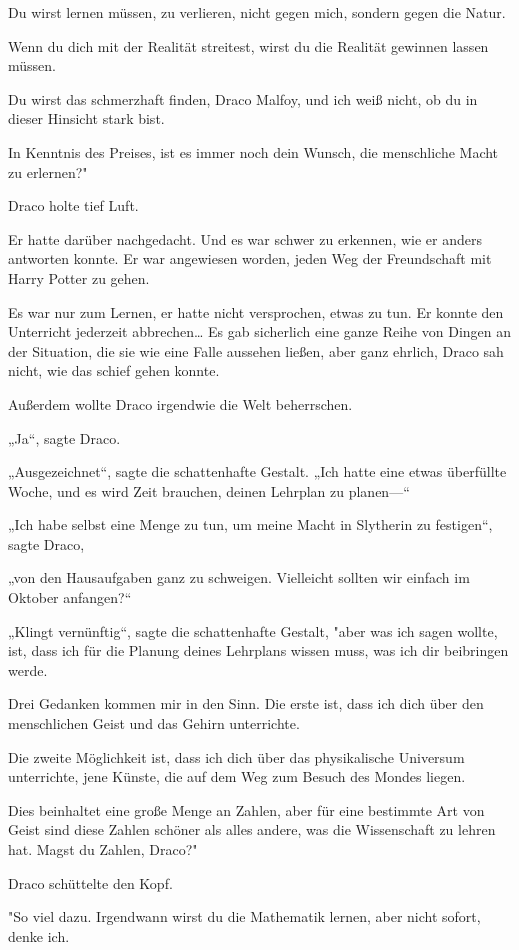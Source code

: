 {Du wirst lernen müssen, zu verlieren, nicht gegen mich, sondern gegen die Natur.

Wenn du dich mit der Realität streitest, wirst du die Realität gewinnen lassen müssen.

Du wirst das schmerzhaft finden, Draco Malfoy, und ich weiß nicht, ob du in dieser Hinsicht stark bist.

In Kenntnis des Preises, ist es immer noch dein Wunsch, die menschliche Macht zu erlernen?"

Draco holte tief Luft.

Er hatte darüber nachgedacht. Und es war schwer zu erkennen, wie er anders antworten konnte. Er war angewiesen worden, jeden Weg der Freundschaft mit Harry Potter zu gehen.

Es war nur zum Lernen, er hatte nicht versprochen, etwas zu tun. Er konnte den Unterricht jederzeit abbrechen… Es gab sicherlich eine ganze Reihe von Dingen an der Situation, die sie wie eine Falle aussehen ließen, aber ganz ehrlich, Draco sah nicht, wie das schief gehen konnte.

Außerdem wollte Draco irgendwie die Welt beherrschen.

„Ja“, sagte Draco.

„Ausgezeichnet“, sagte die schattenhafte Gestalt. „Ich hatte eine etwas überfüllte Woche, und es wird Zeit brauchen, deinen Lehrplan zu planen—“

„Ich habe selbst eine Menge zu tun, um meine Macht in Slytherin zu festigen“, sagte Draco,

„von den Hausaufgaben ganz zu schweigen. Vielleicht sollten wir einfach im Oktober anfangen?“

„Klingt vernünftig“, sagte die schattenhafte Gestalt, "aber was ich sagen wollte, ist, dass ich für die Planung deines Lehrplans wissen muss, was ich dir beibringen werde.

Drei Gedanken kommen mir in den Sinn. Die erste ist, dass ich dich über den menschlichen Geist und das Gehirn unterrichte.

Die zweite Möglichkeit ist, dass ich dich über das physikalische Universum unterrichte, jene Künste, die auf dem Weg zum Besuch des Mondes liegen.

Dies beinhaltet eine große Menge an Zahlen, aber für eine bestimmte Art von Geist sind diese Zahlen schöner als alles andere, was die Wissenschaft zu lehren hat. Magst du Zahlen, Draco?"

Draco schüttelte den Kopf.

"So viel dazu. Irgendwann wirst du die Mathematik lernen, aber nicht sofort, denke ich.

}
